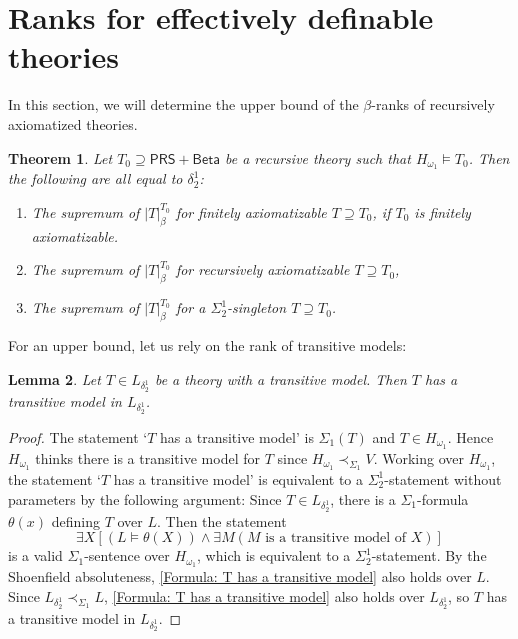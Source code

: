 \documentclass{amsart}
\newtheorem{theorem}{Theorem}[section]
\newtheorem{lemma}[theorem]{Lemma}
\theoremstyle{remark}
\newcommand{\PRS}{\mathsf{PRS}}
\newcommand{\Beta}{\mathsf{Beta}}
\begin{document}
\section{Ranks for effectively definable theories}

In this section, we will determine the upper bound of the $\beta$-ranks of recursively axiomatized theories.
\begin{theorem} \label{Theorem: Main theorem for the beta rank of effective theories}
    Let $T_0\supseteq\PRS+\Beta$ be a recursive theory such that $H_{\omega_1}\vDash T_0$. Then the following are all equal to $\delta^1_2$:
    \begin{enumerate}
        \item The supremum of $|T|_{\beta}^{T_0}$ for finitely axiomatizable $T\supseteq T_0$, if $T_0$ is finitely axiomatizable.
        \item The supremum of $|T|_{\beta}^{T_0}$ for recursively axiomatizable $T\supseteq T_0$,
        \item The supremum of $|T|_{\beta}^{T_0}$ for a $\Sigma^1_2$-singleton $T\supseteq T_0$.
    \end{enumerate}
\end{theorem}

For an upper bound, let us rely on the rank of transitive models:
\begin{lemma} \label{Lemma: beta satisfiable theory has a model in L delta 1 2}
    Let $T\in L_{\delta^1_2}$ be a theory with a transitive model. Then $T$ has a transitive model in $L_{\delta^1_2}$.
\end{lemma}
\begin{proof}
    The statement `$T$ has a transitive model' is $\Sigma_1(T)$ and $T\in H_{\omega_1}$. Hence $H_{\omega_1}$ thinks there is a transitive model for $T$ since $H_{\omega_1}\prec_{\Sigma_1} V$.
    Working over $H_{\omega_1}$, the statement `$T$ has a transitive model' is equivalent to a $\Sigma^1_2$-statement without parameters by the following argument: Since $T\in L_{\delta^1_2}$, there is a $\Sigma_1$-formula $\theta(x)$ defining $T$ over $L$. Then the statement
    \begin{equation} \label{Formula: T has a transitive model}
        \exists X [(L\vDash \theta(X))\land \exists M (\text{$M$ is a transitive model of $X$})]
    \end{equation}
    is a valid $\Sigma_1$-sentence over $H_{\omega_1}$, which is equivalent to a $\Sigma^1_2$-statement. By the Shoenfield absoluteness, \eqref{Formula: T has a transitive model} also holds over $L$.
    Since $L_{\delta^1_2}\prec_{\Sigma_1} L$, \eqref{Formula: T has a transitive model} also holds over $L_{\delta^1_2}$, so $T$ has a transitive model in $L_{\delta^1_2}$.
\end{proof}
\end{document}
